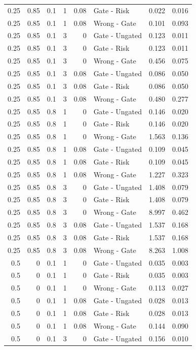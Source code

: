\begin{longtable}{rrrrrlrr}
0.25 & 0.85 & 0.1 & 1 & 0.08 & Gate - Risk & 0.022 & 0.016\\
0.25 & 0.85 & 0.1 & 1 & 0.08 & Wrong - Gate & 0.101 & 0.093\\
0.25 & 0.85 & 0.1 & 3 & 0 & Gate - Ungated & 0.123 & 0.011\\
0.25 & 0.85 & 0.1 & 3 & 0 & Gate - Risk & 0.123 & 0.011\\
0.25 & 0.85 & 0.1 & 3 & 0 & Wrong - Gate & 0.456 & 0.075\\
0.25 & 0.85 & 0.1 & 3 & 0.08 & Gate - Ungated & 0.086 & 0.050\\
0.25 & 0.85 & 0.1 & 3 & 0.08 & Gate - Risk & 0.086 & 0.050\\
0.25 & 0.85 & 0.1 & 3 & 0.08 & Wrong - Gate & 0.480 & 0.277\\
0.25 & 0.85 & 0.8 & 1 & 0 & Gate - Ungated & 0.146 & 0.020\\
0.25 & 0.85 & 0.8 & 1 & 0 & Gate - Risk & 0.146 & 0.020\\
0.25 & 0.85 & 0.8 & 1 & 0 & Wrong - Gate & 1.563 & 0.136\\
0.25 & 0.85 & 0.8 & 1 & 0.08 & Gate - Ungated & 0.109 & 0.045\\
0.25 & 0.85 & 0.8 & 1 & 0.08 & Gate - Risk & 0.109 & 0.045\\
0.25 & 0.85 & 0.8 & 1 & 0.08 & Wrong - Gate & 1.227 & 0.323\\
0.25 & 0.85 & 0.8 & 3 & 0 & Gate - Ungated & 1.408 & 0.079\\
0.25 & 0.85 & 0.8 & 3 & 0 & Gate - Risk & 1.408 & 0.079\\
0.25 & 0.85 & 0.8 & 3 & 0 & Wrong - Gate & 8.997 & 0.462\\
0.25 & 0.85 & 0.8 & 3 & 0.08 & Gate - Ungated & 1.537 & 0.168\\
0.25 & 0.85 & 0.8 & 3 & 0.08 & Gate - Risk & 1.537 & 0.168\\
0.25 & 0.85 & 0.8 & 3 & 0.08 & Wrong - Gate & 8.263 & 1.008\\
0.5 & 0 & 0.1 & 1 & 0 & Gate - Ungated & 0.035 & 0.003\\
0.5 & 0 & 0.1 & 1 & 0 & Gate - Risk & 0.035 & 0.003\\
0.5 & 0 & 0.1 & 1 & 0 & Wrong - Gate & 0.113 & 0.027\\
0.5 & 0 & 0.1 & 1 & 0.08 & Gate - Ungated & 0.028 & 0.013\\
0.5 & 0 & 0.1 & 1 & 0.08 & Gate - Risk & 0.028 & 0.013\\
0.5 & 0 & 0.1 & 1 & 0.08 & Wrong - Gate & 0.144 & 0.090\\
0.5 & 0 & 0.1 & 3 & 0 & Gate - Ungated & 0.156 & 0.010\\

\end{longtable}
